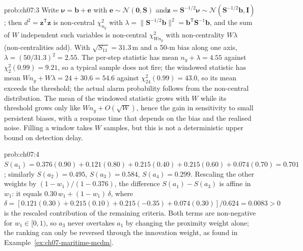 \begin{sol}{prob:ch07:3}
Write $\boldsymbol{\nu}=\mathbf{b}+\mathbf{e}$ with $\mathbf{e}\sim\mathcal{N}(\mathbf{0},\mathbf{S})$ and\allowbreak $\mathbf{z}=\mathbf{S}^{-1/2}\boldsymbol{\nu}\sim\mathcal{N}(\mathbf{S}^{-1/2}\mathbf{b},\mathbf{I})$; then $d^{2}=\mathbf{z}^{\mathsf T}\mathbf{z}$ is non-central $\chi^{2}_{n_y}$ with $\lambda=\|\mathbf{S}^{-1/2}\mathbf{b}\|^{2}=\mathbf{b}^{\mathsf T}\mathbf{S}^{-1}\mathbf{b}$, and the sum of $W$ independent such variables is non-central $\chi^{2}_{Wn_y}$ with non-centrality $W\lambda$ (non-centralities add). With $\sqrt{S_{11}}=31.3$\,m and a 50-m bias along one axis, $\lambda=(50/31.3)^{2}=2.55$. The per-step statistic has mean $n_y+\lambda=4.55$ against $\chi^{2}_{2}(0.99)=9.21$, so a typical sample does not fire; the windowed statistic has mean $Wn_y+W\lambda=24+30.6=54.6$ against $\chi^{2}_{24}(0.99)=43.0$, so its mean exceeds the threshold; the actual alarm probability follows from the non-central distribution. The mean of the windowed statistic grows with $W$ while its threshold grows only like $Wn_y+O(\sqrt{W})$, hence the gain in sensitivity to small persistent biases, with a response time that depends on the bias and the realised noise. Filling a window takes $W$ samples, but this is not a deterministic upper bound on detection delay.
\end{sol}
\begin{sol}{prob:ch07:4}
$S(a_1)=0.376(0.90)+0.121(0.80)+0.215(0.40)+0.215(0.60)+0.074(0.70)=0.701$; similarly $S(a_2)=0.495$, $S(a_3)=0.584$, $S(a_4)=0.299$. Rescaling the other weights by $(1-w_1)/(1-0.376)$, the difference $S(a_1)-S(a_3)$ is affine in $w_1$: it equals $0.30\,w_1+(1-w_1)\,\delta$, where $\delta=[0.121(0.30)+0.215(0.10)+0.215(-0.35)+0.074(0.30)]/0.624=0.0083>0$ is the rescaled contribution of the remaining criteria. Both terms are non-negative for $w_1\in[0,1)$, so $a_3$ never overtakes $a_1$ by changing the proximity weight alone; the ranking can only be reversed through the innovation weight, as found in Example~\ref{ex:ch07-maritime-mcdm}.
\end{sol}
